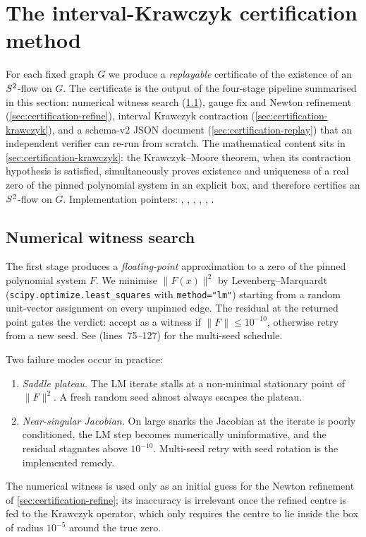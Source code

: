 \section{The interval-Krawczyk certification method}
\label{sec:certification}

For each fixed graph $G$ we produce a \emph{replayable} certificate of
the existence of an $S^{2}$-flow on $G$. The certificate is the
output of the four-stage pipeline summarised in this section:
numerical witness search (\cref{sec:certification-witness}), gauge fix
and Newton refinement (\cref{sec:certification-refine}), interval
Krawczyk contraction (\cref{sec:certification-krawczyk}), and a
schema-v2 JSON document (\cref{sec:certification-replay}) that an
independent verifier can re-run from scratch. The mathematical
content sits in
\cref{sec:certification-krawczyk}: the Krawczyk--Moore theorem, when
its contraction hypothesis is satisfied, simultaneously proves
existence and uniqueness of a real zero of the pinned polynomial
system in an explicit box, and therefore certifies an
$S^{2}$-flow on $G$. Implementation pointers: ,
, ,
, ,
.

\subsection{Numerical witness search}
\label{sec:certification-witness}

The first stage produces a \emph{floating-point} approximation to a
zero of the pinned polynomial system $F$. We minimise
$\lVert F(x) \rVert^{2}$ by Levenberg--Marquardt
(\texttt{scipy.optimize.least\_squares} with \texttt{method="lm"})
starting from a random unit-vector assignment on every unpinned edge.
The residual at the returned point gates the verdict: accept as a
witness if $\lVert F \rVert \le 10^{-10}$, otherwise retry from a new
seed. See  (lines~75--127) for
the multi-seed schedule.

Two failure modes occur in practice:
\begin{enumerate}[label=(\roman*)]
  \item \emph{Saddle plateau.} The LM iterate stalls at a
        non-minimal stationary point of $\lVert F \rVert^{2}$.
        A fresh random seed almost always escapes the plateau.
  \item \emph{Near-singular Jacobian.} On large snarks the
        Jacobian at the iterate is poorly conditioned, the LM step
        becomes numerically uninformative, and the residual
        stagnates above $10^{-10}$. Multi-seed retry with seed
        rotation is the implemented remedy.
\end{enumerate}
The numerical witness is used only as an initial guess for the
Newton refinement of \cref{sec:certification-refine}; its inaccuracy
is irrelevant once the refined centre is fed to the Krawczyk operator,
which only requires the centre to lie inside the box of radius
$10^{-5}$ around the true zero.

